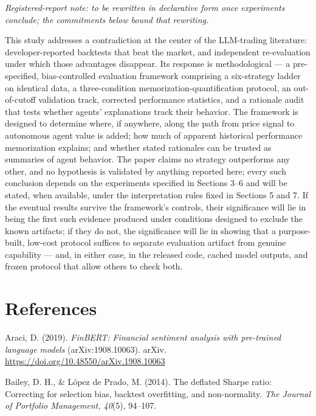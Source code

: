 \documentclass[
  12pt,
]{article}
\begin{document}
\emph{Registered-report note: to be rewritten in declarative form once
experiments conclude; the commitments below bound that rewriting.}

This study addresses a contradiction at the center of the LLM-trading
literature: developer-reported backtests that beat the market, and
independent re-evaluation under which those advantages disappear. Its
response is methodological --- a pre-specified, bias-controlled
evaluation framework comprising a six-strategy ladder on identical data,
a three-condition memorization-quantification protocol, an out-of-cutoff
validation track, corrected performance statistics, and a rationale
audit that tests whether agents' explanations track their behavior. The
framework is designed to determine where, if anywhere, along the path
from price signal to autonomous agent value is added; how much of
apparent historical performance memorization explains; and whether
stated rationales can be trusted as summaries of agent behavior. The
paper claims no strategy outperforms any other, and no hypothesis is
validated by anything reported here; every such conclusion depends on
the experiments specified in Sections 3--6 and will be stated, when
available, under the interpretation rules fixed in Sections 5 and 7. If
the eventual results survive the framework's controls, their
significance will lie in being the first such evidence produced under
conditions designed to exclude the known artifacts; if they do not, the
significance will lie in showing that a purpose-built, low-cost protocol
suffices to separate evaluation artifact from genuine capability ---
and, in either case, in the released code, cached model outputs, and
frozen protocol that allow others to check both.

\hypertarget{references}{%
\section{References}\label{references}}

\begingroup
\setlength{\parindent}{-0.5in}\setlength{\leftskip}{0.5in}\setlength{\parskip}{4pt}
\noindent\kern-0.5in{}Araci, D. (2019). \emph{FinBERT: Financial sentiment analysis with
pre-trained language models} (arXiv:1908.10063). arXiv.
\url{https://doi.org/10.48550/arXiv.1908.10063}

Bailey, D. H., \& López de Prado, M. (2014). The deflated Sharpe ratio:
Correcting for selection bias, backtest overfitting, and non-normality.
\emph{The Journal of Portfolio Management, 40}(5), 94--107.
\end{document}
